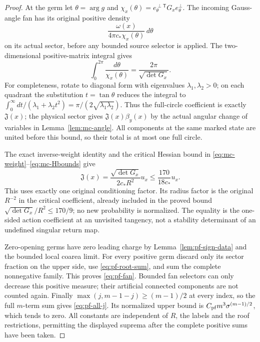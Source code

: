 \begin{proof}
At the germ let $\theta=\arg g$ and
$\chi_x(\theta)=e_\theta^{\perp\mathsf T}G_xe_\theta^\perp$.
The incoming Gauss-angle fan has its original positive density
\[
              \frac{\omega(x)}{4\pi c_*\chi_x(\theta)}
                           \,d\theta
\]
on its actual sector, before any bounded source selector is
applied.  The two-dimensional positive-matrix integral gives
\[
 \int_0^{2\pi}\frac{d\theta}{\chi_x(\theta)}
             =\frac{2\pi}{\sqrt{\det G_x}}.
\]
For completeness, rotate to diagonal form with eigenvalues
$\lambda_1,\lambda_2>0$; on each quadrant the substitution
$t=\tan\theta$ reduces the integral to
$\int_0^\infty dt/(\lambda_1+\lambda_2t^2)
 =\pi/(2\sqrt{\lambda_1\lambda_2})$.
Thus the full-circle coefficient is exactly $\mathfrak J(x)$;
the physical sector gives $\mathfrak J(x)\beta_y(x)$ by the
actual angular change of variables in Lemma~\ref{lem:mc-angle}.
All components at the same marked state are united before this
bound, so their total is at most one full circle.

The exact inverse-weight identity and the critical Hessian bound
in \eqref{eq:mc-weight}--\eqref{eq:mc-Hbounds} give
\[
 \mathfrak J(x)
   =\frac{\sqrt{\det G_x}}{2c_*R^2}u_x
   \le\frac{170}{18c_*}u_x.
\]
This uses exactly one original conditioning factor.  Its radius
factor is the original $R^{-2}$ in the critical coefficient,
already included in the proved bound
$\sqrt{\det G_x}/R^2\le170/9$; no new probability is normalized.
The equality is the one-sided action coefficient at an unvisited
tangency, not a stability determinant of an undefined singular
return map.

Zero-opening germs have zero leading charge by
Lemma~\ref{lem:pf-sign-data} and the bounded local coarea limit.
For every positive germ discard only its sector fraction on the
upper side, use \eqref{eq:pf-root-sum}, and sum the complete
nonnegative family.  This proves \eqref{eq:pf-fan}.  Bounded
fan selectors can only decrease this positive measure; their
artificial connected components are not counted again.
Finally $\max(j,m-1-j)\ge(m-1)/2$ at every index, so the
full $m$-term sum gives \eqref{eq:pf-all-j}.  Its normalized
upper bound is $C_{\rm pf}m^3\sigma^{(m-1)/2}$, which tends
to zero.  All constants are independent of $R$, the labels and
the roof restrictions, permitting the displayed suprema after
the complete positive sums have been taken.
\end{proof}

